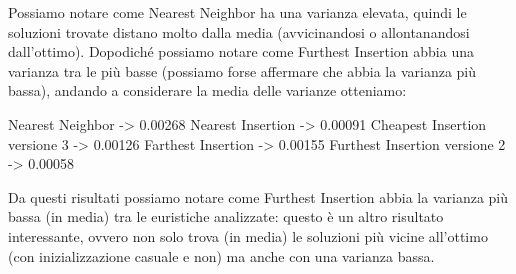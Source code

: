 \documentclass[a4paper,12pt]{report}
\begin{document}
Possiamo notare come Nearest Neighbor ha una varianza elevata, quindi le soluzioni trovate distano molto dalla media (avvicinandosi o allontanandosi dall'ottimo). Dopodiché possiamo notare come Furthest Insertion abbia una varianza tra le più basse (possiamo forse affermare che abbia la varianza più bassa), andando a considerare la media delle varianze otteniamo:
\begin{myverbatim}
Nearest Neighbor ->              0.00268
Nearest Insertion ->             0.00091
Cheapest Insertion versione 3 -> 0.00126
Farthest Insertion ->            0.00155
Furthest Insertion versione 2 -> 0.00058
\end{myverbatim}
Da questi risultati possiamo notare come Furthest Insertion abbia la varianza più bassa (in media) tra le euristiche analizzate: questo è un altro risultato interessante, ovvero non solo trova (in media) le soluzioni più vicine all'ottimo (con inizializzazione casuale e non) ma anche con una varianza bassa.
\end{document}
